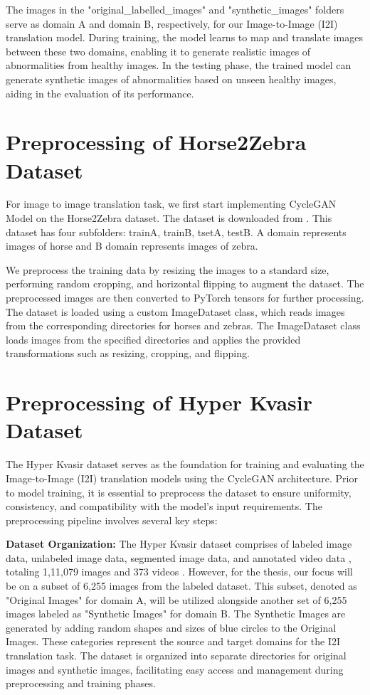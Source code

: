 \documentclass[UKenglish,12pt]{master-style}
\begin{document}
The images in the "original\_labelled\_images" and "synthetic\_images" folders serve as domain A and domain B, respectively, for our Image-to-Image (I2I) translation model. During training, the model learns to map and translate images between these two domains, enabling it to generate realistic images of abnormalities from healthy images. In the testing phase, the trained model can generate synthetic images of abnormalities based on unseen healthy images, aiding in the evaluation of its performance.

\section{Preprocessing of Horse2Zebra Dataset}

For image to image translation task, we first start implementing CycleGAN Model on the Horse2Zebra dataset. The dataset is downloaded from \cite{kaggle_horse2zebra_dataset}. This dataset has four subfolders: trainA, trainB, tsetA, testB. A domain represents images of horse and B domain represents images of zebra.

We preprocess the training data by resizing the images to a standard size, performing random cropping, and horizontal flipping to augment the dataset. The preprocessed images are then converted to PyTorch tensors for further processing. The dataset is loaded using a custom ImageDataset class, which reads images from the corresponding directories for horses and zebras. The ImageDataset class loads images from the specified directories and applies the provided transformations such as resizing, cropping, and flipping.

\section{Preprocessing of Hyper Kvasir Dataset}

The Hyper Kvasir dataset serves as the foundation for training and evaluating the Image-to-Image (I2I) translation models using the CycleGAN architecture. Prior to model training, it is essential to preprocess the dataset to ensure uniformity, consistency, and compatibility with the model's input requirements. The preprocessing pipeline involves several key steps:

\textbf{{Dataset Organization:}}
The Hyper Kvasir dataset comprises of labeled image data, unlabeled image data, segmented image data, and annotated video data , totaling 1,11,079 images and 373 videos \cite{HyperKvasir_Dataset}. However, for the thesis, our focus will be on a subset of 6,255 images from the labeled dataset. This subset, denoted as "Original Images" for domain A, will be utilized alongside another set of 6,255 images labeled as "Synthetic Images" for domain B. The Synthetic Images are generated by adding random shapes and sizes of blue circles to the Original Images. These categories represent the source and target domains for the I2I translation task. The dataset is organized into separate directories for original images and synthetic images, facilitating easy access and management during preprocessing and training phases.
\end{document}
